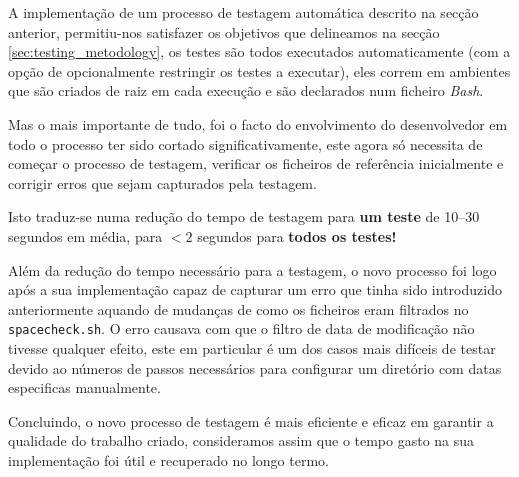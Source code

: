 A implementação de um processo de testagem automática descrito na secção
anterior, permitiu-nos satisfazer os objetivos que delineamos na secção
\ref{sec:testing_metodology}, os testes são todos executados automaticamente
(com a opção de opcionalmente restringir os testes a executar), eles correm em
ambientes que são criados de raiz em cada execução e são declarados num ficheiro
\emph{Bash}.

Mas o mais importante de tudo, foi o facto do envolvimento do desenvolvedor
em todo o processo ter sido cortado significativamente, este agora só necessita
de começar o processo de testagem, verificar os ficheiros de referência
inicialmente e corrigir erros que sejam capturados pela testagem.

Isto traduz-se numa redução do tempo de testagem para \textbf{um teste} de
\numrange{10}{30} segundos em média, para $< 2$ segundos para
\textbf{todos os testes!}

Além da redução do tempo necessário para a testagem, o novo processo foi logo
após a sua implementação capaz de capturar um erro que tinha sido introduzido
anteriormente aquando de mudanças de como os ficheiros eram filtrados no
\Verb|spacecheck.sh|. O erro causava com que o filtro de data de modificação não
tivesse qualquer efeito, este em particular é um dos casos mais difíceis de
testar devido ao números de passos necessários para configurar um diretório com
datas especificas manualmente.

Concluindo, o novo processo de testagem é mais eficiente e eficaz em garantir
a qualidade do trabalho criado, consideramos assim que o tempo gasto na sua
implementação foi útil e recuperado no longo termo.
